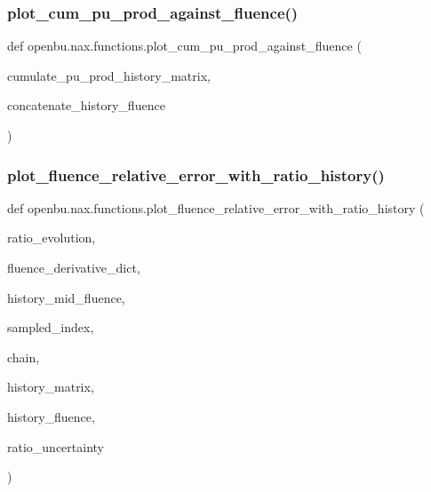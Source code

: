 \subsubsection{\texorpdfstring{plot\+\_\+cum\+\_\+pu\+\_\+prod\+\_\+against\+\_\+fluence()}{plot\_cum\_pu\_prod\_against\_fluence()}}
{\footnotesize\ttfamily def openbu.\+nax.\+functions.\+plot\+\_\+cum\+\_\+pu\+\_\+prod\+\_\+against\+\_\+fluence (\begin{DoxyParamCaption}\item[{}]{cumulate\+\_\+pu\+\_\+prod\+\_\+history\+\_\+matrix,  }\item[{}]{concatenate\+\_\+history\+\_\+fluence }\end{DoxyParamCaption})}

\mbox{\label{namespaceopenbu_1_1nax_1_1functions_a665dee04bfbd9c88665f2f288d4e5d9f}} 
\subsubsection{\texorpdfstring{plot\+\_\+fluence\+\_\+relative\+\_\+error\+\_\+with\+\_\+ratio\+\_\+history()}{plot\_fluence\_relative\_error\_with\_ratio\_history()}}
{\footnotesize\ttfamily def openbu.\+nax.\+functions.\+plot\+\_\+fluence\+\_\+relative\+\_\+error\+\_\+with\+\_\+ratio\+\_\+history (\begin{DoxyParamCaption}\item[{}]{ratio\+\_\+evolution,  }\item[{}]{fluence\+\_\+derivative\+\_\+dict,  }\item[{}]{history\+\_\+mid\+\_\+fluence,  }\item[{}]{sampled\+\_\+index,  }\item[{}]{chain,  }\item[{}]{history\+\_\+matrix,  }\item[{}]{history\+\_\+fluence,  }\item[{}]{ratio\+\_\+uncertainty }\end{DoxyParamCaption})}

